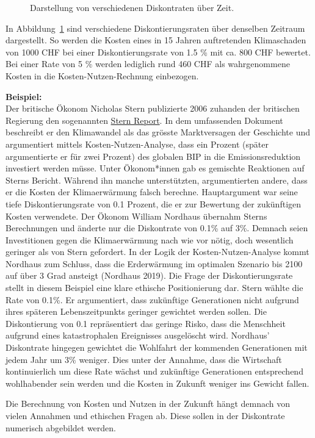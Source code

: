 \documentclass[
  nswissgerman,
  a4paper,
  DIV=11,
  numbers=noendperiod,
  oneside,
  openany]{scrreprt}
\begin{document}
\begin{tcolorbox}
\begin{figure}[H]
\caption{\label{fig-diskontraten}Darstellung von verschiedenen
Diskontraten über Zeit.}

\end{figure}%

In Abbildung~\ref{fig-diskontraten} sind verschiedene
Diskontierungsraten über denselben Zeitraum dargestellt. So werden die
Kosten eines in 15 Jahren auftretenden Klimaschaden von 1000 CHF bei
einer Diskontierungsrate von 1.5 \% mit ca. 800 CHF bewertet. Bei einer
Rate von 5 \% werden lediglich rund 460 CHF als wahrgenommene Kosten in
die Kosten-Nutzen-Rechnung einbezogen.

\textbf{Beispiel:}\\
Der britische Ökonom Nicholas Stern publizierte 2006 zuhanden der
britischen Regierung den sogenannten
\href{https://webarchive.nationalarchives.gov.uk/ukgwa/20100407172811/https:/www.hm-treasury.gov.uk/stern_review_report.htm}{Stern
Report}. In dem umfassenden Dokument beschreibt er den Klimawandel als
das grösste Marktversagen der Geschichte und argumentiert mittels
Kosten-Nutzen-Analyse, dass ein Prozent (später argumentierte er für
zwei Prozent) des globalen BIP in die Emissionsreduktion investiert
werden müsse. Unter Ökonom*innen gab es gemischte Reaktionen auf Sterns
Bericht. Während ihn manche unterstützten, argumentierten andere, dass
er die Kosten der Klimaerwärmung falsch berechne. Hauptargument war
seine tiefe Diskontierungsrate von 0.1 Prozent, die er zur Bewertung der
zukünftigen Kosten verwendete. Der Ökonom William Nordhaus übernahm
Sterns Berechnungen und änderte nur die Diskontrate von 0.1\% auf 3\%.
Demnach seien Investitionen gegen die Klimaerwärmung nach wie vor nötig,
doch wesentlich geringer als von Stern gefordert. In der Logik der
Kosten-Nutzen-Analyse kommt Nordhaus zum Schluss, dass die Erderwärmung
im optimalen Szenario bis 2100 auf über 3 Grad ansteigt (Nordhaus 2019).
Die Frage der Diskontierungsrate stellt in diesem Beispiel eine klare
ethische Positionierung dar. Stern wählte die Rate von 0.1\%. Er
argumentiert, dass zukünftige Generationen nicht aufgrund ihres späteren
Lebenszeitpunkts geringer gewichtet werden sollen. Die Diskontierung von
0.1 repräsentiert das geringe Risko, dass die Menschheit aufgrund eines
katastrophalen Ereignisses ausgelöscht wird. Nordhaus' Diskontrate
hingegen gewichtet die Wohlfahrt der kommenden Generationen mit jedem
Jahr um 3\% weniger. Dies unter der Annahme, dass die Wirtschaft
kontinuierlich um diese Rate wächst und zukünftige Generationen
entsprechend wohlhabender sein werden und die Kosten in Zukunft weniger
ins Gewicht fallen.

Die Berechnung von Kosten und Nutzen in der Zukunft hängt demnach von
vielen Annahmen und ethischen Fragen ab. Diese sollen in der Diskontrate
numerisch abgebildet werden.

\end{tcolorbox}
\end{document}
